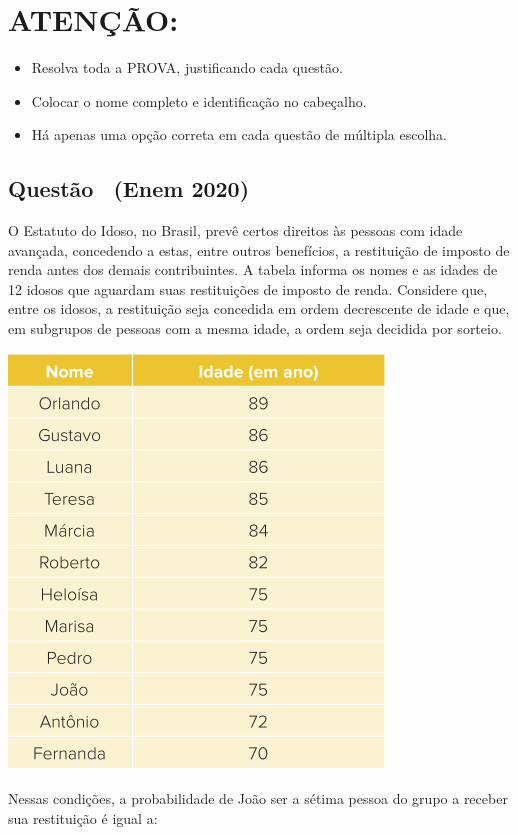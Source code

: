 \documentclass[12pt]{article}
\newcounter{questao}
\newcommand{\novaquestao}[1]{%
	\stepcounter{questao}%
	\subsection*{Questão \thequestao\ (#1)}%
}
\begin{document}
	\section*{\textbf{ATENÇÃO:}}
	\begin{itemize}[noitemsep]
		\item Resolva toda a PROVA, justificando cada questão.
		\item Colocar o nome completo e identificação no cabeçalho.
		\item Há apenas uma opção correta em cada questão de múltipla escolha.
	\end{itemize}
	\begin{multicols}{2}
		\columnseprule=0.4pt
		\columnsep=20pt
		
		\novaquestao{Enem 2020}
		
			O Estatuto do Idoso, no Brasil, prevê certos direitos às pessoas com idade avançada, concedendo a estas, entre outros benefícios, a restituição de imposto de renda antes dos demais contribuintes. A tabela informa os nomes e as idades de 12 idosos que aguardam suas restituições de imposto de renda. Considere que, entre os idosos, a restituição seja concedida em ordem decrescente de idade e que,
			em subgrupos de pessoas com a mesma idade, a ordem seja decidida por sorteio.
			
			\begin{center}
				\includegraphics[scale=0.6]{imagens/enem-2020.png}
			\end{center} Nessas condições, a probabilidade de João ser a sétima pessoa do grupo a receber sua restituição é igual a:
			

\end{multicols}
\end{document}
